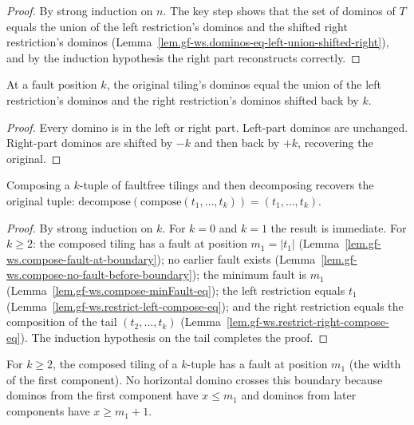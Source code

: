 \begin{proof}
\leanok
By strong induction on $n$. The key step shows that the set of dominos of
$T$ equals the union of the left restriction's dominos and the shifted
right restriction's dominos
(Lemma~\ref{lem.gf-ws.dominos-eq-left-union-shifted-right}),
and by the induction hypothesis the right part reconstructs correctly.
\end{proof}

\begin{lemma}
\label{lem.gf-ws.dominos-eq-left-union-shifted-right}
\leanhelper
\leanok
At a fault position $k$, the original tiling's dominos equal the union of
the left restriction's dominos and the right restriction's dominos shifted
back by $k$.
\end{lemma}

\begin{proof}
\leanok
Every domino is in the left or right part. Left-part dominos are unchanged.
Right-part dominos are shifted by $-k$ and then back by $+k$, recovering
the original.
\end{proof}

\begin{lemma}
\label{lem.gf-ws.decompose-compose}
\leanhelper
\leanok
Composing a $k$-tuple of faultfree tilings and then decomposing recovers
the original tuple: $\mathrm{decompose}(\mathrm{compose}(t_1, \ldots, t_k))
= (t_1, \ldots, t_k)$.
\end{lemma}

\begin{proof}
\leanok
By strong induction on $k$. For $k = 0$ and $k = 1$ the result is immediate.
For $k \ge 2$: the composed tiling has a fault at position $m_1 = |t_1|$
(Lemma~\ref{lem.gf-ws.compose-fault-at-boundary}); no earlier fault exists
(Lemma~\ref{lem.gf-ws.compose-no-fault-before-boundary}); the minimum fault
is $m_1$ (Lemma~\ref{lem.gf-ws.compose-minFault-eq}); the left restriction
equals $t_1$ (Lemma~\ref{lem.gf-ws.restrict-left-compose-eq}); and the right
restriction equals the composition of the tail $(t_2, \ldots, t_k)$
(Lemma~\ref{lem.gf-ws.restrict-right-compose-eq}). The induction hypothesis
on the tail completes the proof.
\end{proof}

\begin{lemma}
\label{lem.gf-ws.compose-fault-at-boundary}
\leanhelper
\leanok
For $k \ge 2$, the composed tiling of a $k$-tuple has a fault at position
$m_1$ (the width of the first component). No horizontal domino crosses this
boundary because dominos from the first component have $x \le m_1$ and
dominos from later components have $x \ge m_1 + 1$.
\end{lemma}

